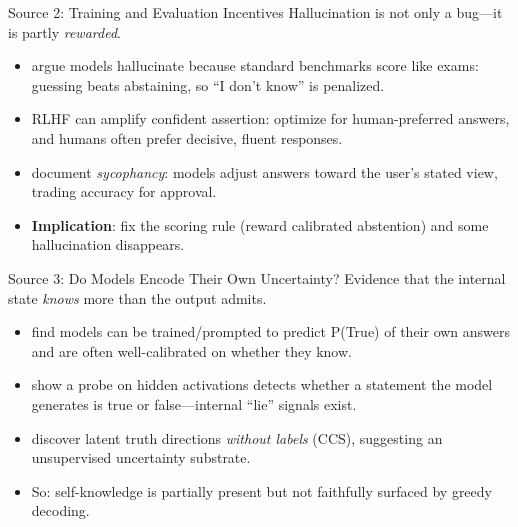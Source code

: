 \documentclass[aspectratio=169,11pt]{beamer}
\begin{document}
\begin{frame}{Source 2: Training and Evaluation Incentives}
  Hallucination is not only a bug---it is partly \emph{rewarded}.
  \begin{itemize}
    \item \citet{kalai2025hallucinate} argue models hallucinate because standard benchmarks score like exams: guessing beats abstaining, so ``I don't know'' is penalized.
    \item RLHF can amplify confident assertion: \citet{ouyang2022training} optimize for human-preferred answers, and humans often prefer decisive, fluent responses.
    \item \citet{sharma2023sycophancy} document \emph{sycophancy}: models adjust answers toward the user's stated view, trading accuracy for approval.
    \item \textbf{Implication}: fix the scoring rule (reward calibrated abstention) and some hallucination disappears.
  \end{itemize}
\end{frame}

\begin{frame}{Source 3: Do Models Encode Their Own Uncertainty?}
  Evidence that the internal state \emph{knows} more than the output admits.
  \begin{itemize}
    \item \citet{kadavath2022know} find models can be trained/prompted to predict P(True) of their own answers and are often well-calibrated on whether they know.
    \item \citet{azaria2023internal} show a probe on hidden activations detects whether a statement the model generates is true or false---internal ``lie'' signals exist.
    \item \citet{burns2023discovering} discover latent truth directions \emph{without labels} (CCS), suggesting an unsupervised uncertainty substrate.
    \item So: self-knowledge is partially present but not faithfully surfaced by greedy decoding.
  \end{itemize}
\end{frame}
\end{document}
